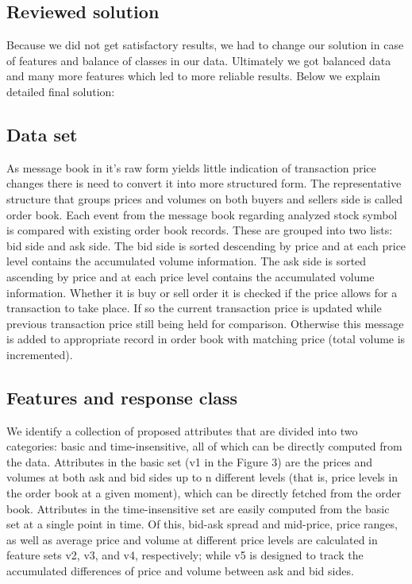 \documentclass[twoside]{article}
\begin{document}
\begin{multicols}{2}
\section{Reviewed solution}

Because we did not get satisfactory results, we had to change our solution in case of features and
balance of classes in our data. Ultimately we got balanced data and many more features which led to more reliable results.
Below we explain detailed final solution:

\subsection{Data set}

As message book in it's raw form yields little indication of transaction price changes there is need to convert it into more structured form. The representative structure  that groups prices and volumes on both buyers and sellers side is called order book.
Each event from the message book regarding analyzed stock symbol is compared with existing order book records. These are grouped into two lists: bid side and ask side. The bid side is sorted descending by price and at each price level contains the accumulated volume information. The ask side is sorted ascending by price and at each price level contains the accumulated volume information. Whether it is buy or sell order it is checked if the price allows for a transaction to take place. If so the current transaction price is updated while previous transaction price still being held for comparison. Otherwise this message is added to appropriate record in order book with matching price (total volume is incremented).

\subsection{Features and response class}
We identify a collection of proposed attributes that are divided into two categories: basic and time-insensitive, all of which can be directly computed from the data. Attributes in the basic set (v1 in the Figure 3) are the prices and volumes at both ask and bid sides up to n different levels (that is, price levels in the order book at a given moment), which can be directly fetched from the order book. Attributes in the time-insensitive set are easily computed from the basic set at a single point in time. Of this, bid-ask spread and mid-price, price ranges, as well as average price and volume at different price levels are calculated in feature sets v2, v3, and v4, respectively; while v5 is designed to track the accumulated differences of price and volume between ask and bid sides.


\end{multicols}
\end{document}
